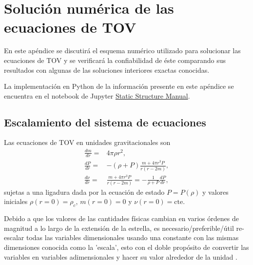 \chapter{Solución numérica de las ecuaciones de TOV}\label{NumSol}
En este apéndice se discutirá el esquema numérico utilizado para solucionar las ecuaciones de TOV y se verificará la confiabilidad de éste comparando sus resultados con algunas de las soluciones interiores exactas conocidas.

La implementación en Python de la información presente en este apéndice se encuentra en el notebook de Jupyter \href{https://nbviewer.jupyter.org/github/DavidRamosSal/stellar_structure/blob/master/Static_structure_manual.ipynb}{Static Structure Manual}.

\section{Escalamiento del sistema de ecuaciones}
Las ecuaciones de TOV en unidades gravitacionales son
\begin{align}
    \frac{dm}{dr}=&4\pi \rho r^2 ,\\
    \frac{dP}{dr}=&-(\rho+P)\frac{m+4\pi r^3 P}{r(r-2m)} , \\
    \frac{d\nu}{dr}=& \frac{m+4\pi r^3 P}{r(r-2m)} =  -\frac{1}{\rho+P}\frac{dP}{dr},
\end{align}
sujetas a una ligadura dada por la ecuación de estado $P=P(\rho)$ y valores iniciales $\rho(r=0)=\rho_c$, $m(r=0)=0$ y $\nu(r=0)=\text{cte}$.

Debido a que los valores de las cantidades físicas cambian en varios órdenes de magnitud a lo largo de la extensión de la estrella, es necesario/preferible/útil re-escalar todas las variables dimensionales usando una constante con las mismas dimensiones conocida como la 'escala', esto con el doble propósito de convertir las variables en variables adimensionales y hacer su valor alrededor de la unidad \cite{Langtangen2016}.

